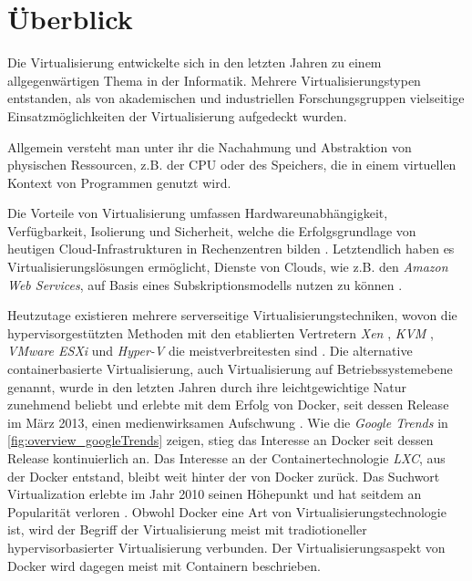 \documentclass[../main.tex]{subfiles}
\begin{document}
\chapter{Überblick}
\label{overview}
  Die Virtualisierung entwickelte sich in den letzten Jahren zu einem allgegenwärtigen Thema in der Informatik. Mehrere Virtualisierungstypen entstanden, als von akademischen und industriellen Forschungsgruppen vielseitige Einsatzmöglichkeiten der Virtualisierung aufgedeckt wurden.

  Allgemein versteht man unter ihr die Nachahmung und Abstraktion von physischen Ressourcen, z.B. der \acrshort{CPU} oder des Speichers, die in einem virtuellen Kontext von Programmen genutzt wird.

  Die Vorteile von Virtualisierung umfassen Hardwareunabhängigkeit, Verfügbarkeit, Isolierung und Sicherheit, welche die Erfolgsgrundlage von heutigen \gls{Cloud}-Infrastrukturen in Rechenzentren bilden \cite[S.1]{containerVirtPerformance}.
  Letztendlich haben es Virtualisierungslösungen ermöglicht, Dienste von Clouds, wie z.B. den \emph{Amazon Web Services}\cite{amazonWebServices}, auf Basis eines Subskriptionsmodells nutzen zu können \cite[S.1]{dockerSec1}.

  Heutzutage existieren mehrere serverseitige Virtualisierungstechniken, wovon die hypervisorgestützten Methoden mit den etablierten Vertretern \emph{Xen} \cite{xen}, \emph{KVM} \cite{kvm}, \emph{VMware ESXi} \cite{vmwareESXi} und \emph{Hyper-V} \cite{hyperv} die meistverbreitesten sind \cite[S.2]{containerVirtPerformance}. Die alternative containerbasierte Virtualisierung, auch Virtualisierung auf Betriebssystemebene genannt, wurde in den letzten Jahren durch ihre leichtgewichtige Natur zunehmend beliebt und erlebte mit dem Erfolg von Docker, seit dessen Release im März 2013, einen medienwirksamen Aufschwung \cite{githubDockerChangelog}. Wie die \emph{Google Trends} in \fig \ref{fig:overview_googleTrends} zeigen, stieg das Interesse an Docker seit dessen Release kontinuierlich an. Das Interesse an der Containertechnologie \emph{LXC}, aus der Docker entstand, bleibt weit hinter der von Docker zurück. Das Suchwort \glqq{}Virtualization\grqq{} erlebte im Jahr 2010 seinen Höhepunkt und hat seitdem an Popularität verloren \cite{googleTrends}. Obwohl Docker eine Art von  Virtualisierungstechnologie ist, wird der Begriff der Virtualisierung meist mit tradiotioneller hypervisorbasierter Virtualisierung verbunden. Der Virtualisierungsaspekt von Docker wird dagegen meist mit Containern beschrieben.
\end{document}
